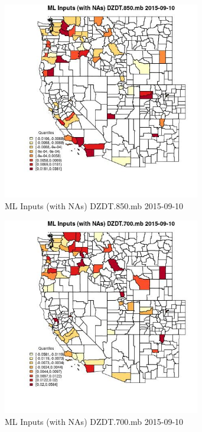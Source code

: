 \begin{figure} 
\centering  
\includegraphics[width=0.77\textwidth]{Code_Outputs/Report_ML_input_PM25_Step4_part_e_de_duplicated_aveswNAs_CountyDZDT850mbMean2015-09-10_2015-09-10.jpg} 
\caption{\label{fig:Report_ML_input_PM25_Step4_part_e_de_duplicated_aveswNAsCountyDZDT850mbMean2015-09-10_2015-09-10}ML Inputs (with NAs) DZDT.850.mb 2015-09-10} 
\end{figure} 
 

\begin{figure} 
\centering  
\includegraphics[width=0.77\textwidth]{Code_Outputs/Report_ML_input_PM25_Step4_part_e_de_duplicated_aveswNAs_CountyDZDT700mbMean2015-09-10_2015-09-10.jpg} 
\caption{\label{fig:Report_ML_input_PM25_Step4_part_e_de_duplicated_aveswNAsCountyDZDT700mbMean2015-09-10_2015-09-10}ML Inputs (with NAs) DZDT.700.mb 2015-09-10} 
\end{figure} 
 
